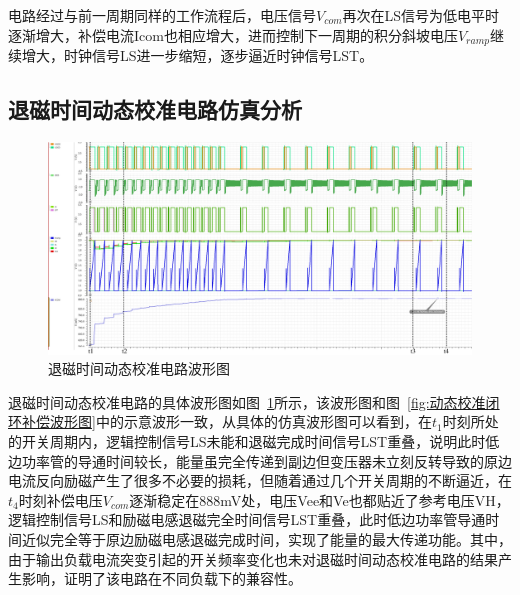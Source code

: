 电路经过与前一周期同样的工作流程后，电压信号$V_{com}$再次在LS信号为低电平时逐渐增大，补偿电流Icom也相应增大，进而控制下一周期的积分斜坡电压$V_{ramp}$继续增大，时钟信号LS进一步缩短，逐步逼近时钟信号LST。

\subsection{退磁时间动态校准电路仿真分析}


\begin{figure}[htbp] 
    \centering
    \includegraphics[width=0.9\linewidth]{figures/StepByStep.pdf}
    \caption{退磁时间动态校准电路波形图}
    \label{fig:退磁时间动态校准电路波形图}
\end{figure}

退磁时间动态校准电路的具体波形图如图~\ref{fig:退磁时间动态校准电路波形图}所示，该波形图和图~\ref{fig:动态校准闭环补偿波形图}中的示意波形一致，从具体的仿真波形图可以看到，在$t_1$时刻所处的开关周期内，逻辑控制信号LS未能和退磁完成时间信号LST重叠，说明此时低边功率管的导通时间较长，能量虽完全传递到副边但变压器未立刻反转导致的原边电流反向励磁产生了很多不必要的损耗，但随着通过几个开关周期的不断逼近，在$t_4$时刻补偿电压$V_{com}$逐渐稳定在888mV处，电压Vee和Ve也都贴近了参考电压VH，逻辑控制信号LS和励磁电感退磁完全时间信号LST重叠，此时低边功率管导通时间近似完全等于原边励磁电感退磁完成时间，实现了能量的最大传递功能。其中，由于输出负载电流突变引起的开关频率变化也未对退磁时间动态校准电路的结果产生影响，证明了该电路在不同负载下的兼容性。

